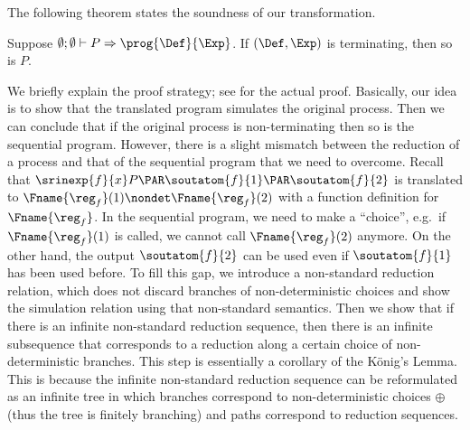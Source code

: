 The following theorem states the soundness of our transformation.
\begin{theorem}[soundness]  \label{thm:soundness}
  Suppose  $\emptyset; \emptyset \vdash P \Rightarrow \prog{\Def}{\Exp}$.
    If $(\Def, \Exp)$ is terminating, then so is $P$.
\end{theorem}
We briefly explain the proof strategy; see 
for the actual proof.
Basically, our idea is to show that the translated program simulates the original process.
Then we can conclude that if the original process is non-terminating then so is the sequential program.
However, there is a slight mismatch between the reduction of a process and that of the sequential program that we need to overcome.
Recall that \( \srinexp{f}{x}P \PAR \soutatom{f}{1} \PAR \soutatom{f}{2} \) is translated to \( \Fname{\reg_f}(1) \nondet \Fname{\reg_f}(2) \) with a function definition for \( \Fname{\reg_f} \).
In the sequential program, we need to make a ``choice'', e.g.~if \( \Fname{\reg_f}(1) \) is called, we cannot call \( \Fname{\reg_f}(2) \) anymore.
On the other hand, the output \( \soutatom{f}{2} \) can be used even if \( \soutatom{f}{1} \) has been used before.
To fill this gap, we introduce a non-standard reduction relation, which does not discard branches of non-deterministic choices and show the simulation relation using that non-standard semantics.
Then we show that if there is an infinite non-standard reduction sequence, then there is an infinite subsequence that corresponds to a reduction along a certain choice of non-deterministic branches.
This step is essentially a corollary of the K\"onig's Lemma.
This is because the infinite non-standard reduction sequence can be reformulated as an infinite tree in which branches correspond to non-deterministic choices \( \oplus \) (thus the tree is finitely branching) and paths correspond to reduction sequences.


